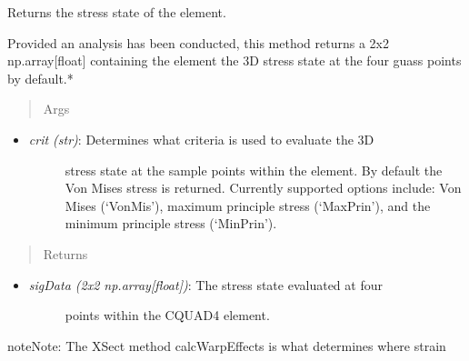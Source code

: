 \documentclass[letterpaper,10pt,english]{sphinxmanual}
\begin{document}
\begin{fulllineitems}
\begin{fulllineitems}
\end{fulllineitems}


\begin{fulllineitems}
\label{structures:AeroComBAT.Structures.CQUAD4.getStressState}
Returns the stress state of the element.

Provided an analysis has been conducted, this method
returns a 2x2 np.array{[}float{]} containing the element the 3D stress
state at the four guass points by default.*
\begin{quote}\begin{description}
\item[{Args}] \leavevmode
\end{description}\end{quote}
\begin{itemize}
\item {} \begin{description}
\item[{\emph{crit (str)}: Determines what criteria is used to evaluate the 3D}] \leavevmode
stress state at the sample points within the element. By
default the Von Mises stress is returned. Currently supported
options include: Von Mises (`VonMis'), maximum principle stress
(`MaxPrin'), and the minimum principle stress (`MinPrin').

\end{description}

\end{itemize}
\begin{quote}\begin{description}
\item[{Returns}] \leavevmode
\end{description}\end{quote}
\begin{itemize}
\item {} \begin{description}
\item[{\emph{sigData (2x2 np.array{[}float{]})}: The stress state evaluated at four}] \leavevmode
points within the CQUAD4 element.

\end{description}

\end{itemize}

\begin{notice}{note}{Note:}
The XSect method calcWarpEffects is what determines where strain
\end{notice}


\end{fulllineitems}
\end{fulllineitems}
\end{document}
